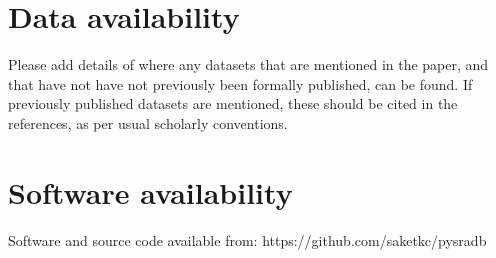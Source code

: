 \documentclass[9pt,a4paper]{extarticle}
\begin{document}
\begin{comment}

\section*{Discussion} %
This section is only required if the paper includes novel data or analyses, and 
should be written in the same style as a traditional discussion section. Please 
include a brief discussion of allowances made (if any) for controlling bias or unwanted sources of variability, and the limitations of any novel datasets.


\section*{Conclusions} %
This section is only required if the paper includes novel data or analyses, and should be written as a traditional conclusion.

\section*{Summary} %
This section is required if the paper does not include novel data or analyses.  It allows authors to briefly summarize the key points from the article.
The need to perform metaanalysis warrants need of more stream lined ways to obtain
data. NCBI provides access to a huge set of datasets across 


\end{comment}

\section*{Data availability} %
Please add details of where any datasets that are mentioned in the paper, and that have not have not previously been formally published, can be found.  If previously published datasets are mentioned, these should be cited in the references, as per usual scholarly conventions.

\section*{Software availability}
Software and source code available from: https://github.com/saketkc/pysradb
\end{document}
